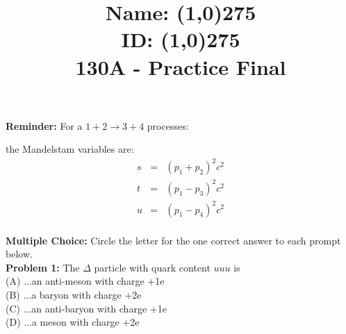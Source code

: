 \documentclass[12pt]{article}
\begin{document}
\newcommand{\ihbar}{\ensuremath{i \hbar}}
\newcommand{\dPsidt}{\ensuremath{ \frac{\partial \Psi}{\partial t} }}
\newcommand{\dPsidx}{\ensuremath{ \frac{\partial \Psi}{\partial x} }}
\newcommand{\ddPsidx}{\ensuremath{ \frac{\partial^2 \Psi}{\partial x^2} }}
\newcommand{\dPssdt}{\ensuremath{ \frac{\partial \Psi^*}{\partial t} }}
\newcommand{\dPssdx}{\ensuremath{ \frac{\partial \Psi^*}{\partial x} }}
\newcommand{\ddPssdx}{\ensuremath{ \frac{\partial^2 \Psi^*}{\partial x^2} }}

\newcommand{\dphidt}{\ensuremath{ \frac{d \phi}{dt} }}
\newcommand{\dpsidx}{\ensuremath{ \frac{d \psi}{dx} }}
\newcommand{\ddpsidx}{\ensuremath{ \frac{d^2 \psi}{dx^2} }}


\date{\vspace{-5ex}}

\title{Name: \line(1,0){275}\\ 
ID: \line(1,0){275}\\
130A - Practice Final}
\date{}

\maketitle

\noindent
{\bf Reminder:} For a $1 + 2 \to 3 + 4$ processes:
\begin{center}
\end{center}
the Mandelstam variables are:
\begin{eqnarray*}
s &=& (p_1 + p_2)^2c^2 \\ 
t &=& (p_1 - p_3)^2c^2 \\ 
u &=& (p_1 - p_4)^2c^2 \\ 
\end{eqnarray*}

\newpage 

\noindent
{\bf Multiple Choice:} Circle the letter for the one correct answer to each prompt below.\\[5pt]

\noindent
{\bf Problem 1:} The $\Delta$ particle with quark content $uuu$ is\\[5pt]
(A) ...an anti-meson with charge +1e\\[5pt]
(B) ...a baryon with charge +2e\\[5pt]
(C) ...an anti-baryon with charge +1e\\[5pt]
(D) ...a meson with charge +2e\\[10pt]
\end{document}
